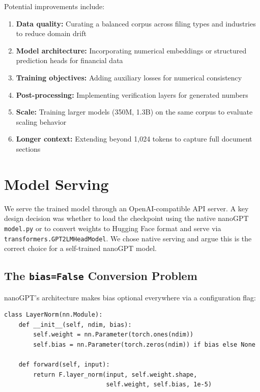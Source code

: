 \documentclass[12pt]{article}
\begin{document}
Potential improvements include:
\begin{enumerate}
    \item \textbf{Data quality:} Curating a balanced corpus across filing types and industries to reduce domain drift
    \item \textbf{Model architecture:} Incorporating numerical embeddings or structured prediction heads for financial data
    \item \textbf{Training objectives:} Adding auxiliary losses for numerical consistency
    \item \textbf{Post-processing:} Implementing verification layers for generated numbers
    \item \textbf{Scale:} Training larger models (350M, 1.3B) on the same corpus to evaluate scaling behavior
    \item \textbf{Longer context:} Extending beyond 1,024 tokens to capture full document sections
\end{enumerate}

\section{Model Serving}

We serve the trained model through an OpenAI-compatible API server. A key design decision was whether to load the checkpoint using the native nanoGPT \texttt{model.py} or to convert weights to Hugging Face format and serve via \texttt{transformers.GPT2LMHeadModel}. We chose native serving and argue this is the correct choice for a self-trained nanoGPT model.

\subsection{The \texttt{bias=False} Conversion Problem}

nanoGPT's architecture makes bias optional everywhere via a configuration flag:

\begin{Verbatim}[fontsize=\small]
class LayerNorm(nn.Module):
    def __init__(self, ndim, bias):
        self.weight = nn.Parameter(torch.ones(ndim))
        self.bias = nn.Parameter(torch.zeros(ndim)) if bias else None

    def forward(self, input):
        return F.layer_norm(input, self.weight.shape,
                            self.weight, self.bias, 1e-5)
\end{Verbatim}
\end{document}

